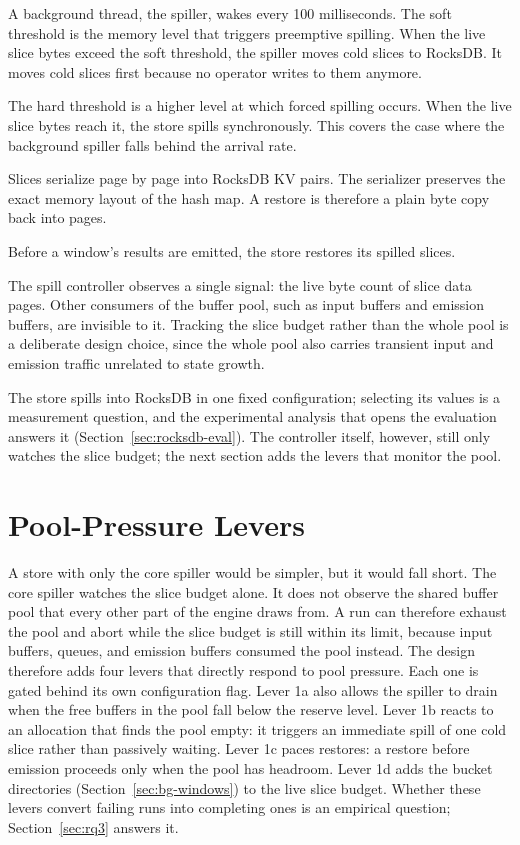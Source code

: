 A background thread, the spiller, wakes every 100 milliseconds.
The soft threshold is the memory level that triggers preemptive spilling.
When the live slice bytes exceed the soft threshold, the spiller moves cold slices to RocksDB.
It moves cold slices first because no operator writes to them anymore.

The hard threshold is a higher level at which forced spilling occurs.
When the live slice bytes reach it, the store spills synchronously.
This covers the case where the background spiller falls behind the arrival rate.

Slices serialize page by page into RocksDB \ac{KV} pairs.
The serializer preserves the exact memory layout of the hash map.
A restore is therefore a plain byte copy back into pages.

Before a window's results are emitted, the store restores its spilled slices.

The spill controller observes a single signal: the live byte count of slice data pages.
Other consumers of the buffer pool, such as input buffers and emission buffers, are invisible to it.
Tracking the slice budget rather than the whole pool is a deliberate design choice, since the whole pool also carries transient input and emission traffic unrelated to state growth.

The store spills into RocksDB in one fixed configuration; selecting its values is a measurement question, and the experimental analysis that opens the evaluation answers it (Section~\ref{sec:rocksdb-eval}).
The controller itself, however, still only watches the slice budget; the next section adds the levers that monitor the pool.

\section{Pool-Pressure Levers\label{sec:levers}}

A store with only the core spiller would be simpler, but it would fall short.
The core spiller watches the slice budget alone.
It does not observe the shared buffer pool that every other part of the engine draws from.
A run can therefore exhaust the pool and abort while the slice budget is still within its limit, because input buffers, queues, and emission buffers consumed the pool instead.
The design therefore adds four levers that directly respond to pool pressure.
Each one is gated behind its own configuration flag.
Lever 1a also allows the spiller to drain when the free buffers in the pool fall below the reserve level.
Lever 1b reacts to an allocation that finds the pool empty: it triggers an immediate spill of one cold slice rather than passively waiting.
Lever 1c paces restores: a restore before emission proceeds only when the pool has headroom.
Lever 1d adds the bucket directories (Section~\ref{sec:bg-windows}) to the live slice budget.
Whether these levers convert failing runs into completing ones is an empirical question; Section~\ref{sec:rq3} answers it.

